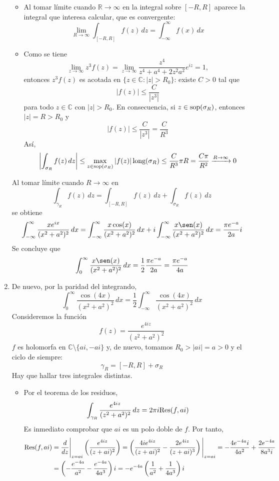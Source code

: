\documentclass[11pt]{report}
\makeatletter
\renewenvironment{proof}[1][\proofname]{\par
  \pushQED{\qed}%
  \normalfont \topsep\z@skip %
  \trivlist
  \item[\hskip\labelsep
        \itshape
    #1\@addpunct{.}]\ignorespaces
}{%
  \popQED\endtrivlist\@endpefalse
}
\newcommand{\R}{\mathbb R}
\newcommand{\C}{\mathbb C}
\makeatother
\begin{document}
\begin{proof}
\begin{enumerate}
\begin{itemize}
  \item Al tomar límite cuando $\R \to \infty$ en la integral sobre $[-R,R]$ aparece la integral que interesa calcular, que es convergente:
  \[\lim_{R \to \infty} \int_{[-R,R]}f(z) \, dz = \int_{-\infty}^\infty f(x)\, dx\]
  \item Como se tiene
  \[\lim_{z \to \infty}z^3f(z)=\lim_{z \to \infty} \frac{z^4}{z^4+a^4+2z^2a^2}e^{iz} = 1,\]
  entonces $z^3f(z)$ es acotada en $\{z \in \C \colon |z|>R_0\}$: existe $C >0$ tal que
  \[|f(z)| \leq \frac{C}{|z^3|}\]
  para todo $z \in \C$ con $|z|>R_0$. En consecuencia, si $z \in \textup{sop}(\sigma_R)$, entonces $|z|=R>R_0$ y 
  \[|f(z)| \leq \frac{C}{|z^3|} = \frac{C}{R^3}\]
  Así,
  \[\left|\int_{\sigma_R} f(z) \, dz\right| \leq \max_{z \in \textup{sop}(\sigma_R)}|f(z)| \, \textup{long}(\sigma_R) \leq \frac{C}{R^3}\pi R = \frac{C\pi}{R^2} \xrightarrow{R \to \infty} 0\]
  \end{itemize}
Al tomar límite cuando $R\to \infty$ en 
\[\int_{\gamma_R}f(z)\, dz = \int_{[-R,R]} f(z)\, dz + \int_{\sigma_R}f(z) \, dz\]
se obtiene
\[\int_{-\infty}^\infty \frac{xe^{ix}}{(x^2+a^2)^2} \, dx = \int_{-\infty}^\infty \frac{x\cos(x)}{(x^2+a^2)^2} \, dx +i\int_{-\infty}^\infty \frac{x\sen(x)}{(x^2+a^2)^2} \, dx =  \frac{\pi e^{-a}}{2a}i \]
Se concluye que
\[\int_{0}^\infty \frac{x\sen(x)}{(x^2+a^2)^2} \, dx = \frac{1}{2}\frac{\pi e^{-a}}{2a} = \frac{\pi e^{-a}}{4a}\]
\item De nuevo, por la paridad del integrando,
\[\int_0^\infty \frac{\cos(4x)}{(x^2+a^2)^2} \, dx = \frac{1}{2}\int_{-\infty}^\infty \frac{\cos(4x)}{(x^2+a^2)^2} \, dx\]
Consideremos la función
\[f(z)=\frac{e^{4iz}}{(z^2+a^2)^2}\]
$f$ es holomorfa en $\C \setminus \{ai,-ai\}$ y, de nuevo, tomamos $R_0>|ai|=a>0$ y el ciclo de siempre:
\[\gamma_R=[-R,R] +\sigma_{R}\]
Hay que hallar tres integrales distintas.
\begin{itemize}
  \item Por el teorema de los residuos,
  \[\int_{\gamma_R} \frac{e^{4iz}}{(z^2+a^2)^2} \, dz= 2\pi i \textup{Res}(f,ai)\]
  Es inmediato comprobar que $ai$ es un polo doble de $f$. Por tanto, \[\begin{aligned}[t]
    \textup{Res}(f,ai) &= \frac{d}{dz} \Bigg|_{z = ai} \left(\frac{e^{4iz}}{(z+ai)^2}\right) = \left(\frac{4ie^{4iz}}{(z+ai)^2}-\frac{2e^{4iz}}{(z+ai)^3}\right)\Bigg|_{z = ai} = -\frac{4e^{-4a}i}{4a^2}+\frac{2e^{-4a}}{8a^3i} \\
    &=  \left(-\frac{e^{-4a}}{a^2}-\frac{e^{-4a}}{4a^3}\right)i = -e^{-4a}\left(\frac{1}{a^2}+\frac{1}{4a^3}\right)i

\end{aligned}\]
\end{itemize}
\end{enumerate}
\end{proof}
\end{document}
